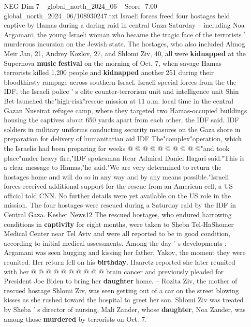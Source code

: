 \begin{textsample}{NEG Dim 7 – global\_north\_2024\_06 – Score -7.00 – global\_north\_2024\_06/108930247.txt}  \label{ex:f7_neg_140}
Israeli forces freed four hostages held captive by Hamas during a daring raid in central Gaza Saturday -- including Noa Argamani, the young Israeli woman who became the tragic face of the terrorists ' murderous incursion on the Jewish state.
The hostages, who also included Almog Meir Jan, 21, Andrey Kozlov, 27, and Shlomi Ziv, 40, all were \textbf{kidnapped} at the Supernova \textbf{music} \textbf{festival} on the morning of Oct. 7, when savage Hamas terrorists killed 1,200 people and \textbf{kidnapped} another 251 during their bloodthirsty rampage across southern Israel.
Israeli special forces from the the IDF, the Israeli police ' s elite counter-terrorism unit and intelligence unit Shin Bet launched the"high-risk"rescue mission at 11 a.m. local time in the central Gazan Nuseirat refugee camp, where they targeted two Hamas-occupied buildings housing the captives about 650 yards apart from each other, the IDF said.
IDF soldiers in military uniforms conducting security measures on the Gaza shore in preparation for delivery of humanitarian aid IDF The"complex"operation, which the Israelis had been preparing for weeks @ @ @ @ @ @ @ @ @ @"and took place"under heavy fire,"IDF spokesman Rear Admiral Daniel Hagari said."This is a clear message to Hamas,"he said."We are very determined to return the hostages home and will do so in any way and by any means possible."Israeli forces received additional support for the rescue from an American cell, a US official told CNN.
No further details were yet available on the US role in the mission.
The four hostages were rescued during a Saturday raid by the IDF in Central Gaza.
Keshet News12 The rescued hostages, who endured harrowing conditions in \textbf{captivity} for eight months, were taken to Sheba Tel-HaShomer Medical Center near Tel Aviv and were all reported to be in good condition, according to initial medical assessments.
Among the day ' s developments : -- Argamani was seen hugging and kissing her father, Yakov, the moment they were reunited.
Her return fell on his \textbf{birthday}.
Haaretz reported she later reunited with her @ @ @ @ @ @ @ @ @ @ brain cancer and previously pleaded for President Joe Biden to bring her \textbf{daughter} home. -- Rozita Ziv, the mother of rescued hostage Shlomi Ziv, was seen getting out of a car on the street blowing kisses as she rushed toward the hospital to greet her son.
Shlomi Ziv was treated by Sheba ' s director of nursing, Mali Zander, whose \textbf{daughter}, Noa Zander, was among those \textbf{murdered} by terrorists on Oct. 7.

\end{textsample}
